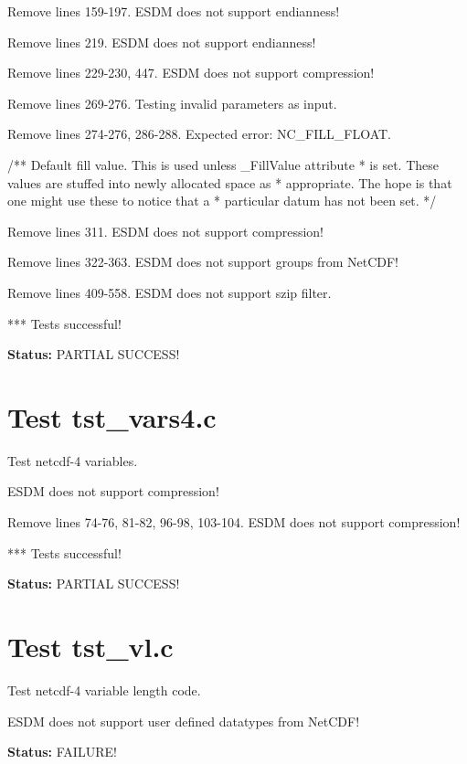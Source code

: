 Remove lines 159-197. ESDM does not support endianness!

Remove lines 219. ESDM does not support endianness!

Remove lines 229-230, 447. ESDM does not support compression!

Remove lines 269-276. Testing invalid parameters as input.

Remove lines 274-276, 286-288. Expected error: NC\_FILL\_FLOAT.

/** Default fill value. This is used unless \_FillValue attribute
 * is set.  These values are stuffed into newly allocated space as
 * appropriate.  The hope is that one might use these to notice that a
 * particular datum has not been set. */

Remove lines 311. ESDM does not support compression!

Remove lines 322-363. ESDM does not support groups from NetCDF!

Remove lines 409-558. ESDM does not support szip filter.

*** Tests successful!

{\bf \large Status: } PARTIAL SUCCESS!

\section{Test tst\_vars4.c}

Test netcdf-4 variables.

ESDM does not support compression!

Remove lines 74-76, 81-82, 96-98, 103-104. ESDM does not support compression!

*** Tests successful!

{\bf \large Status: } PARTIAL SUCCESS!

\section{Test tst\_vl.c}

Test netcdf-4 variable length code.

ESDM does not support user defined datatypes from NetCDF!

{\bf \large Status: } FAILURE!

\clearpage

